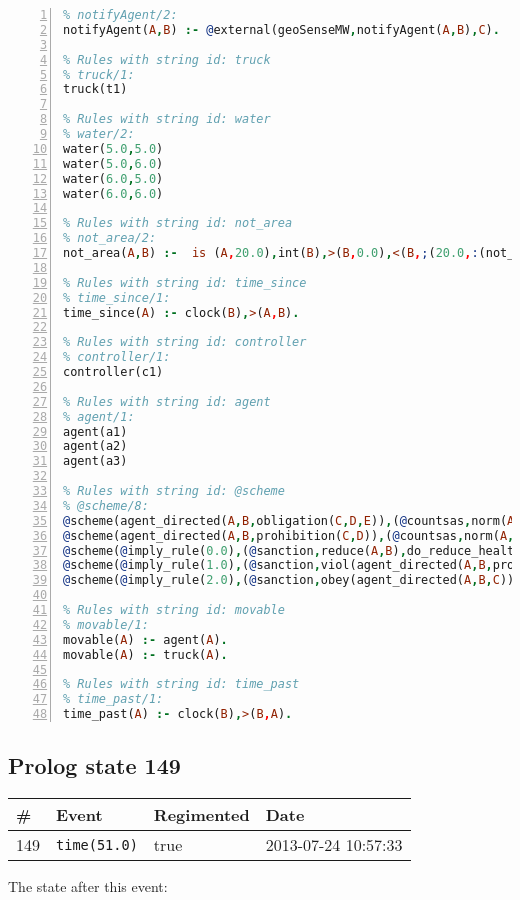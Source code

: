 \documentclass[11pt]{article}\usepackage[utf8]{inputenc}\usepackage{geometry}
\begin{document}
\begin{lstlisting}[language=Prolog, numbers=left]
% Rules with string id: notifyAgent
% notifyAgent/2:
notifyAgent(A,B) :- @external(geoSenseMW,notifyAgent(A,B),C).

% Rules with string id: truck
% truck/1:
truck(t1)

% Rules with string id: water
% water/2:
water(5.0,5.0)
water(5.0,6.0)
water(6.0,5.0)
water(6.0,6.0)

% Rules with string id: not_area
% not_area/2:
not_area(A,B) :-  is (A,20.0),int(B),>(B,0.0),<(B,;(20.0,:(not_area(A,B), is (-(B),20.0)))),int(A),>(A,0.0),<(A,;(20.0,:(area(A,B),-(int(A))))),int(B),>(A,0.0),>(B,0.0),<(A,21.0),<(B,21.0).

% Rules with string id: time_since
% time_since/1:
time_since(A) :- clock(B),>(A,B).

% Rules with string id: controller
% controller/1:
controller(c1)

% Rules with string id: agent
% agent/1:
agent(a1)
agent(a2)
agent(a3)

% Rules with string id: @scheme
% @scheme/8:
@scheme(agent_directed(A,B,obligation(C,D,E)),(@countsas,norm(A,B,F,obligation(C,D,E)),F),false,(listTrue(C)),(time_past(D)),false,[plus(viol(agent_directed(A,B,obligation(C,D,E))))|[]],[plus(obey(agent_directed(A,B,obligation(C,D,E))))|[]])
@scheme(agent_directed(A,B,prohibition(C,D)),(@countsas,norm(A,B,E,prohibition(C,D)),E),(listTrue(C)),false,(false),false,[plus(viol(agent_directed(A,B,prohibition(C,D))))|[]],[plus(obey(agent_directed(A,B,prohibition(C,D))))|[]])
@scheme(@imply_rule(0.0),(@sanction,reduce(A,B),do_reduce_health(A,B),notifyAgent(A,changed(status))),true,false,false,false,[min(reduce(A,B))|[]],[])
@scheme(@imply_rule(1.0),(@sanction,viol(agent_directed(A,B,prohibition(C,D))),do_sanction(D)),true,false,false,false,[min(viol(agent_directed(A,B,prohibition(C,D))))|[]],[])
@scheme(@imply_rule(2.0),(@sanction,obey(agent_directed(A,B,C))),true,false,false,false,[min(obey(agent_directed(A,B,C)))|[]],[])

% Rules with string id: movable
% movable/1:
movable(A) :- agent(A).
movable(A) :- truck(A).

% Rules with string id: time_past
% time_past/1:
time_past(A) :- clock(B),>(B,A).

\end{lstlisting}
\clearpage 
\subsection{Prolog state 149}
\begin{table}[ht]
\centering 
\begin{tabular}{l l l l} 
\textbf{\#} & \textbf{Event} & \textbf{Regimented} & \textbf{Date} \\ [0.5ex] 
\hline
149&\texttt{time(51.0)}&true&2013-07-24 10:57:33\\ [1ex] \hline\end{tabular}
\end{table}
The state after this event:
\end{document}
